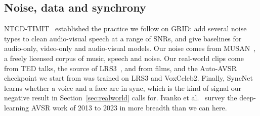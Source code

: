 \subsection{Noise, data and synchrony}
NTCD-TIMIT~\cite{abdelaziz2017} established the practice we follow on GRID: add several noise types
to clean audio-visual speech at a range of SNRs, and give baselines for audio-only, video-only and
audio-visual models. Our noise comes from MUSAN~\cite{snyder2015}, a freely licensed corpus of music,
speech and noise. Our real-world clips come from TED talks, the source of LRS3~\cite{afouras2018},
and from films, and the Auto-AVSR checkpoint we start from was trained on LRS3 and VoxCeleb2. Finally,
SyncNet~\cite{chung2017} learns whether a voice and a face are in sync, which is the kind of signal
our negative result in Section~\ref{sec:realworld} calls for. Ivanko et al.~\cite{ivanko2023} survey
the deep-learning AVSR work of 2013 to 2023 in more breadth than we can here.
